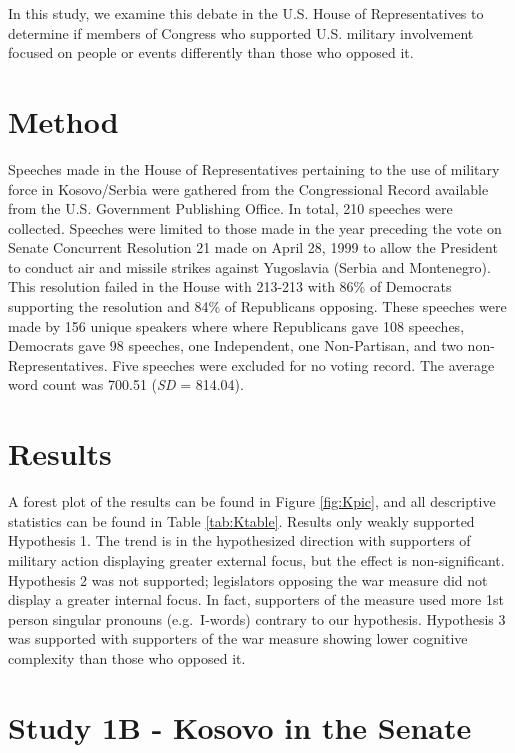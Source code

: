 \documentclass[english,,man]{apa6}
\begin{document}
In this study, we examine this debate in the U.S. House of Representatives to determine if members of Congress who supported U.S. military involvement focused on people or events differently than those who opposed it.

\hypertarget{method-1}{%
\section{Method}\label{method-1}}

Speeches made in the House of Representatives pertaining to the use of military force in Kosovo/Serbia were gathered from the Congressional Record available from the U.S. Government Publishing Office. In total, 210 speeches were collected. Speeches were limited to those made in the year preceding the vote on Senate Concurrent Resolution 21 made on April 28, 1999 to allow the President to conduct air and missile strikes against Yugoslavia (Serbia and Montenegro). This resolution failed in the House with 213-213 with 86\% of Democrats supporting the resolution and 84\% of Republicans opposing. These speeches were made by 156 unique speakers where where Republicans gave 108 speeches, Democrats gave 98 speeches, one Independent, one Non-Partisan, and two non-Representatives. Five speeches were excluded for no voting record. The average word count was 700.51 (\emph{SD} = 814.04).

\hypertarget{results}{%
\section{Results}\label{results}}

A forest plot of the results can be found in Figure \ref{fig:Kpic}, and all descriptive statistics can be found in Table \ref{tab:Ktable}. Results only weakly supported Hypothesis 1. The trend is in the hypothesized direction with supporters of military action displaying greater external focus, but the effect is non-significant. Hypothesis 2 was not supported; legislators opposing the war measure did not display a greater internal focus. In fact, supporters of the measure used more 1st person singular pronouns (e.g.~I-words) contrary to our hypothesis. Hypothesis 3 was supported with supporters of the war measure showing lower cognitive complexity than those who opposed it.

\hypertarget{study-1b---kosovo-in-the-senate}{%
\section{Study 1B - Kosovo in the Senate}\label{study-1b---kosovo-in-the-senate}}
\end{document}
